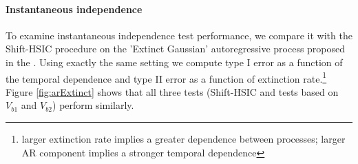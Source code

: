 \vspace{-0.2cm}
\paragraph{Instantaneous independence}
To examine instantaneous independence test performance, we compare it with the Shift-HSIC procedure \cite{chwialkowski2014kernel} on the 'Extinct Gaussian' autoregressive process proposed in the \cite[Section 4.1]{chwialkowski2014kernel}. Using exactly the same setting we compute type I error as a function of the temporal dependence and type II error as a function of extinction rate.\footnote{larger extinction rate implies a greater dependence between processes; larger AR component implies a stronger temporal dependence}  Figure \ref{fig:arExtinct} shows that all three tests (Shift-HSIC and tests based on $V_{b1}$ and $V_{b2}$) perform similarly.   
\vspace{-0.2cm}
